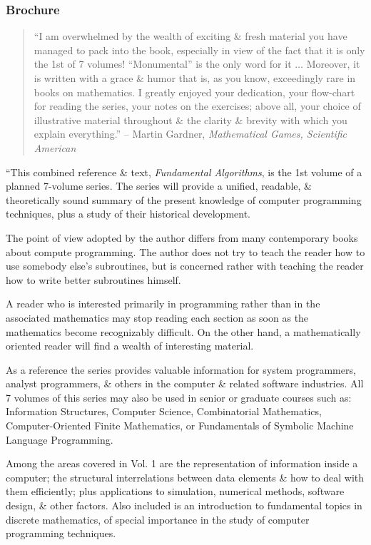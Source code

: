 \documentclass[oneside]{book}
\numberwithin{equation}{section}
\begin{document}
\subsubsection{Brochure}

\begin{quotation}
	``I am overwhelmed by the wealth of exciting \& fresh material you have managed to pack into the book, especially in view of the fact that it is only the 1st of 7 volumes! ``Monumental'' is the only word for it $\ldots$ Moreover, it is written with a grace \& humor that is, as you know, exceedingly rare in books on mathematics. I greatly enjoyed your dedication, your flow-chart for reading the series, your notes on the exercises; above all, your choice of illustrative material throughout \& the clarity \& brevity with which you explain everything.'' -- Martin Gardner, \textit{Mathematical Games, Scientific American}
\end{quotation}
``This combined reference \& text, \textit{Fundamental Algorithms}, is the 1st volume of a planned 7-volume series. The series will provide a unified, readable, \& theoretically sound summary of the present knowledge of computer programming techniques, plus a study of their historical development.

The point of view adopted by the author differs from many contemporary books about compute programming. The author does not try to teach the reader how to use somebody else's subroutines, but is concerned rather with teaching the reader how to write better subroutines himself.

A reader who is interested primarily in programming rather than in the associated mathematics may stop reading each section as soon as the mathematics become recognizably difficult. On the other hand, a mathematically oriented reader will find a wealth of interesting material.

As a reference the series provides valuable information for system programmers, analyst programmers, \& others in the computer \& related software industries. All 7 volumes of this series may also be used in senior or graduate courses such as: Information Structures, Computer Science, Combinatorial Mathematics, Computer-Oriented Finite Mathematics, or Fundamentals of Symbolic Machine Language Programming.

Among the areas covered in Vol. 1 are the representation of information inside a computer; the structural interrelations between data elements \& how to deal with them efficiently; plus applications to simulation, numerical methods, software design, \& other factors. Also included is an introduction to fundamental topics in discrete mathematics, of special importance in the study of computer programming techniques.
\end{document}
